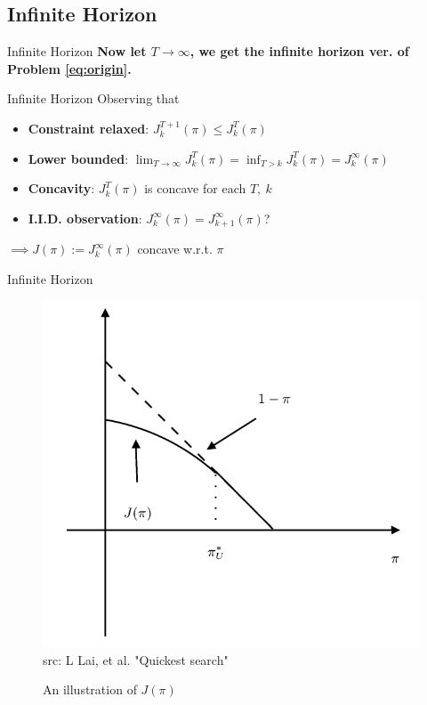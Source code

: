 \documentclass[xcolor={svgnames}]{beamer}
\begin{document}
\subsection{Infinite Horizon}

\begin{frame}{Infinite Horizon}
  \textbf{Now let \alert{$T \to \infty$}, we get the infinite horizon ver. of Problem \eqref{eq:origin}.}
\end{frame}
\begin{frame}{Infinite Horizon}
  Observing that
  \begin{itemize}
    \item \textbf{Constraint relaxed}: $J^{T+1}_k(\pi) \le J^{T}_k(\pi)$
    \item \textbf{Lower bounded}: $\displaystyle \lim_{T\to \infty} J^T_k(\pi) = \inf_{T>k} J^T_k(\pi) = J^{\infty}_k(\pi)$
    \item \textbf{Concavity}: $J^T_k(\pi)$ is concave for each $T, ~k$
    \item \textbf{I.I.D. observation}: $J^{\infty}_k(\pi) = J^{\infty}_{k+1}(\pi)$?
  \end{itemize}
  \pause
  $\implies J(\pi):= J^{\infty}_{k}(\pi)$ concave w.r.t. $\pi$
\end{frame}
\begin{frame}{Infinite Horizon}
  \begin{figure}
      \centering
      \includegraphics[width=.6\textwidth]{fig4}\\[-8pt]
      {\tiny src: L Lai, et al. "Quickest search"}
      \caption{An illustration of $J(\pi)$}
  \end{figure}
\end{frame}
\end{document}
